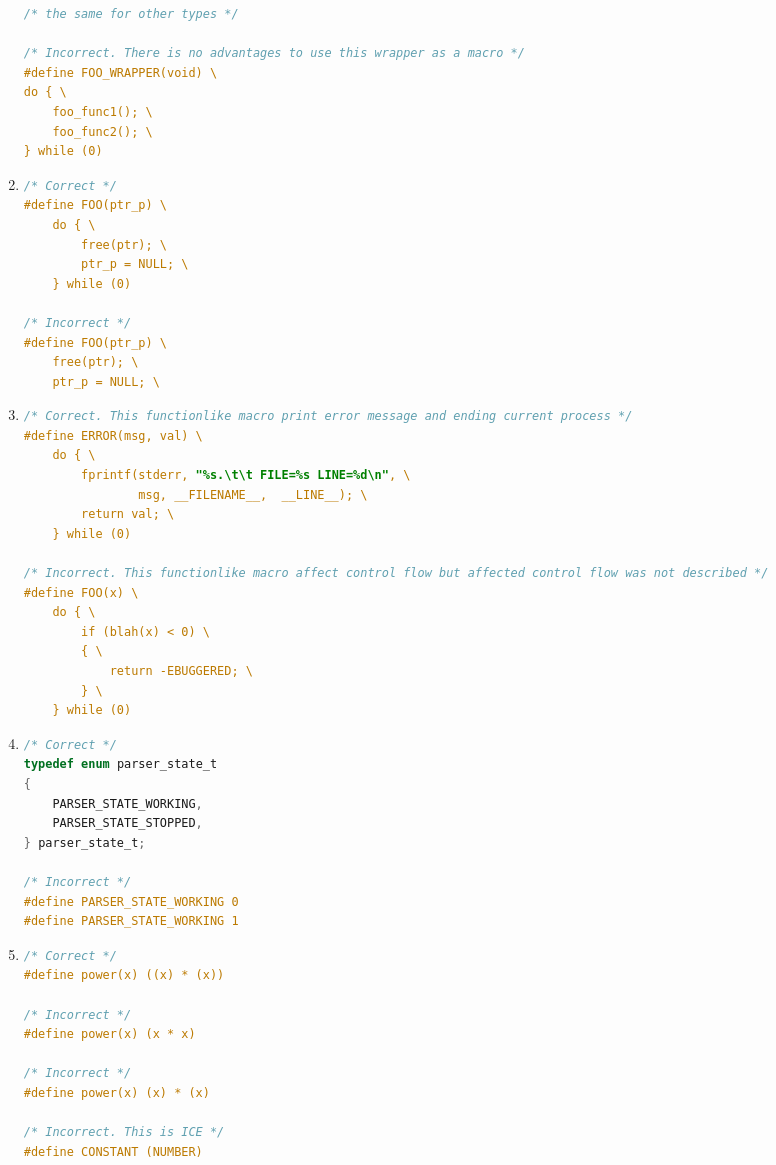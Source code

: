 \begin{enumerate}
\begin{lstlisting}[language=C,style=C99]
/* the same for other types */

/* Incorrect. There is no advantages to use this wrapper as a macro */
#define FOO_WRAPPER(void) \
do { \
    foo_func1(); \
    foo_func2(); \
} while (0)

\end{lstlisting}   


    \item 
\begin{lstlisting}[language=C,style=C99]
/* Correct */
#define FOO(ptr_p) \
    do { \
        free(ptr); \
        ptr_p = NULL; \
    } while (0)
    
/* Incorrect */
#define FOO(ptr_p) \
    free(ptr); \
    ptr_p = NULL; \
\end{lstlisting}   

    \item 
\begin{lstlisting}[language=C,style=C99]
/* Correct. This functionlike macro print error message and ending current process */
#define ERROR(msg, val) \
    do { \
        fprintf(stderr, "%s.\t\t FILE=%s LINE=%d\n", \
                msg, __FILENAME__,  __LINE__); \
        return val; \
    } while (0) 

/* Incorrect. This functionlike macro affect control flow but affected control flow was not described */
#define FOO(x) \
    do { \
        if (blah(x) < 0) \
        { \
            return -EBUGGERED; \
        } \
    } while (0)
\end{lstlisting}

    \item 
\begin{lstlisting}[language=C,style=C99]
/* Correct */
typedef enum parser_state_t
{
    PARSER_STATE_WORKING,
    PARSER_STATE_STOPPED,
} parser_state_t;

/* Incorrect */
#define PARSER_STATE_WORKING 0
#define PARSER_STATE_WORKING 1
\end{lstlisting}

    \item
\begin{lstlisting}[language=C,style=C99]
/* Correct */
#define power(x) ((x) * (x))

/* Incorrect */
#define power(x) (x * x)

/* Incorrect */
#define power(x) (x) * (x)

/* Incorrect. This is ICE */
#define CONSTANT (NUMBER)
\end{lstlisting}
\end{enumerate}

